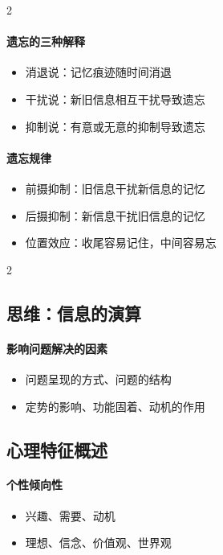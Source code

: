 \documentclass[b5paper,11pt]{article}
\begin{document}
\begingroup
{}
\setlength{\columnsep}{1em}
\begin{paracol}{2}

  \paragraph{遗忘的三种解释}
  \begin{itemize}
    \item [-] 消退说：记忆痕迹随时间消退
    \item [-] 干扰说：新旧信息相互干扰导致遗忘
    \item [-] 抑制说：有意或无意的抑制导致遗忘
  \end{itemize}

  \switchcolumn

  \paragraph{遗忘规律}
  \begin{itemize}
    \item [-] 前摄抑制：旧信息干扰新信息的记忆
    \item [-] 后摄抑制：新信息干扰旧信息的记忆
    \item [-] 位置效应：收尾容易记住，中间容易忘
  \end{itemize}

\end{paracol}
\endgroup

\begingroup
{}
\setlength{\columnsep}{1em}
\begin{paracol}{2}
  \subsection*{思维：信息的演算}
  \paragraph{影响问题解决的因素}
  \begin{itemize}
    \item 问题呈现的方式、问题的结构
    \item 定势的影响、功能固着、动机的作用
  \end{itemize}

  \switchcolumn

  \subsection*{心理特征概述}
  \paragraph{个性倾向性}
  \begin{itemize}
    \item 兴趣、需要、动机
    \item 理想、信念、价值观、世界观
  \end{itemize}

\end{paracol}
\endgroup
\end{document}
